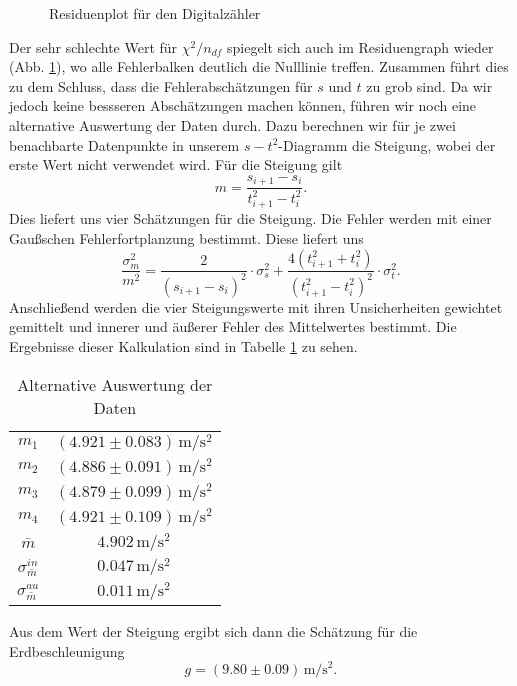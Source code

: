 \documentclass[a4paper, 12pt]{scrartcl}
\begin{document}
\begin{figure}[h!]
	\centering
	\caption{Residuenplot für den Digitalzähler}
	\label{ResDz}
\end{figure}

Der sehr schlechte Wert für $\chi^2/n_{df}$ spiegelt sich auch im Residuengraph wieder (Abb. \ref{ResDz}), wo alle Fehlerbalken deutlich die Nulllinie treffen. Zusammen führt dies zu dem Schluss, dass die Fehlerabschätzungen für $s$ und $t$ zu grob sind. Da wir jedoch keine bessseren Abschätzungen machen können, führen wir noch eine alternative Auswertung der Daten durch. Dazu berechnen wir für je zwei benachbarte Datenpunkte in unserem $s-t^2$-Diagramm die Steigung, wobei der erste Wert nicht verwendet wird. Für die Steigung gilt
$$m = \frac{s_{i+1}-s_i}{t_{i+1}^2-t_{i}^2}.$$
Dies liefert uns vier Schätzungen für die Steigung. Die Fehler werden mit einer Gaußschen Fehlerfortplanzung bestimmt. Diese liefert uns
$$\frac{\sigma_m^2}{m^2} = \frac{2}{(s_{i+1}-s_i)^2}\cdot\sigma_s^2 + \frac{4(t_{i+1}^2 + t_i^2)}{(t_{i+1}^2-t_i^2)^2}\cdot\sigma_t^2.$$
Anschließend werden die vier Steigungswerte mit ihren Unsicherheiten gewichtet gemittelt und innerer und äußerer Fehler des Mittelwertes bestimmt. Die Ergebnisse dieser Kalkulation sind in Tabelle \ref{tableAltAus} zu sehen. 

\begin{table}[h!]
\begin{center}
\begin{tabular}{c|c}
$m_1$ & $(4.921 \pm 0.083) \, \mathrm m / \mathrm s^2$ \\ 
$m_2$ & $(4.886 \pm 0.091) \, \mathrm m / \mathrm s^2$ \\
$m_3$ & $(4.879 \pm 0.099) \, \mathrm m / \mathrm s^2$ \\
$m_4$ & $(4.921 \pm 0.109) \, \mathrm m / \mathrm s^2$ \\
\hline
$\bar m$ & $4.902 \, \mathrm m / \mathrm s^2$ \\
$\sigma^{in}_{\bar m}$ & $0.047 \, \mathrm m / \mathrm s^2$ \\
$\sigma^{au}_{\bar m}$ & $0.011 \, \mathrm m / \mathrm s^2$
\end{tabular}
\caption{Alternative Auswertung der Daten}
\label{tableAltAus}
\end{center}
\end{table}
Aus dem Wert der Steigung ergibt sich dann die Schätzung für die Erdbeschleunigung
$$g = (9.80 \pm 0.09) \, \mathrm m / \mathrm s^2 .$$
\end{document}
